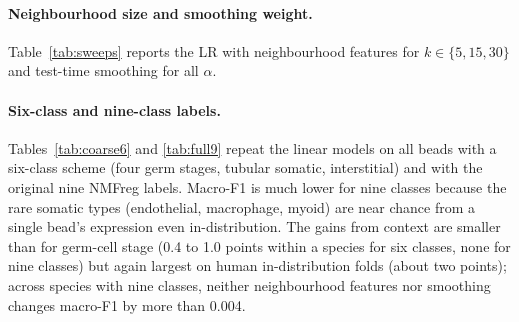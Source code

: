 \paragraph{Neighbourhood size and smoothing weight.} Table~\ref{tab:sweeps} reports the LR with neighbourhood features for $k\in\{5,15,30\}$ and test-time smoothing for all $\alpha$.

\begin{table}[H]
\centering
\caption{Sensitivity to neighbourhood size $k$ (LR on expression plus neighbourhood mean) and to the smoothing weight $\alpha$ (expression-only LR posterior smoothed over the test puck's 15-nearest-neighbour graph). Macro-F1 for germ-cell stage, mean over test pucks.}
\label{tab:sweeps}
\small

\end{table}

\paragraph{Six-class and nine-class labels.} Tables~\ref{tab:coarse6} and \ref{tab:full9} repeat the linear models on all beads with a six-class scheme (four germ stages, tubular somatic, interstitial) and with the original nine NMFreg labels. Macro-F1 is much lower for nine classes because the rare somatic types (endothelial, macrophage, myoid) are near chance from a single bead's expression even in-distribution. The gains from context are smaller than for germ-cell stage (0.4 to 1.0 points within a species for six classes, none for nine classes) but again largest on human in-distribution folds (about two points); across species with nine classes, neither neighbourhood features nor smoothing changes macro-F1 by more than 0.004.

\begin{table}[H]
\centering
\caption{Six-class annotation (SPG, SPC, RS, ES, tubular somatic, interstitial), all beads. Macro-F1, mean $\pm$ SD across test pucks.}
\label{tab:coarse6}
\footnotesize
\setlength{\tabcolsep}{2.5pt}

\end{table}

\begin{table}[H]
\centering
\caption{Nine-class annotation with the original NMFreg labels, all beads. Macro-F1, mean $\pm$ SD across test pucks.}
\label{tab:full9}
\footnotesize
\setlength{\tabcolsep}{2.5pt}

\end{table}

